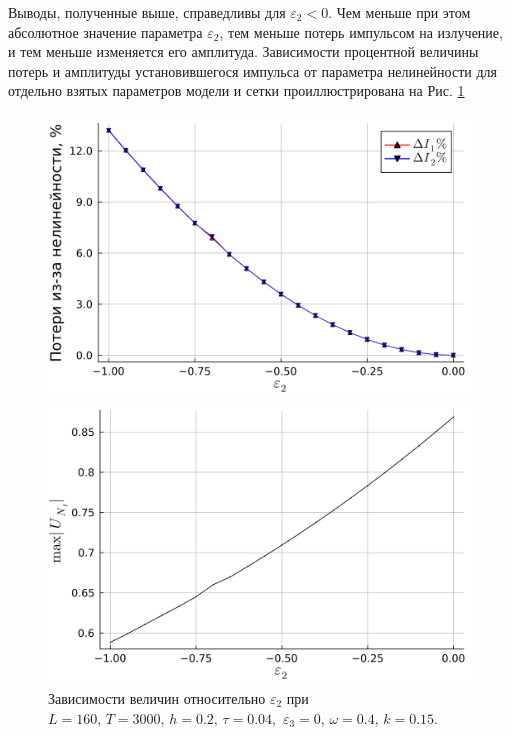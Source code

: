 \documentclass[14pt,a4paper]{extreport}
\begin{document}
			Выводы, полученные выше, справедливы для \(\varepsilon_{2}<0\). Чем меньше при этом абсолютное значение параметра \(\varepsilon_{2}\), тем меньше потерь импульсом на излучение, и тем меньше изменяется его амплитуда. Зависимости процентной величины потерь и амплитуды установившегося импульса от параметра нелинейности для отдельно взятых параметров модели и сетки проиллюстрирована на Рис. \ref{fig340-5_1}
			\begin{figure}[H] %
				\begin{center}
					\begin{minipage}[h]{0.48\linewidth}
						\includegraphics[width=1\linewidth]{fig72.png}
					\end{minipage}
					\hfill
					\begin{minipage}[h]{0.48\linewidth}
						\includegraphics[width=1\linewidth]{fig73.png}
					\end{minipage}
				\end{center}
				\caption{Зависимости величин относительно \(\varepsilon_{2}\) при
				\(L=160,\, T=3000,\, h=0.2,\, \tau=0.04,\)
				\(\varepsilon_{3}=0,\, \omega=0.4,\, k=0.15\).}
				\label{fig340-5_1}
			\end{figure}
\end{document}
